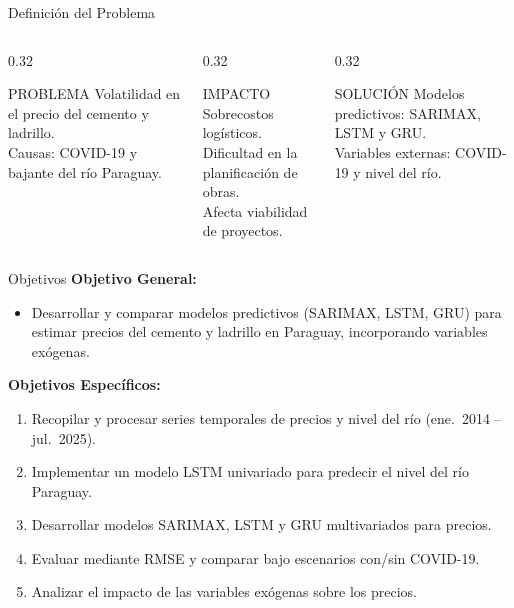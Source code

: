 \documentclass[12pt, aspectratio=169]{beamer}
\begin{document}
\begin{frame}{Definici\'on del Problema}
\begin{columns}[T]
  \begin{column}{0.32\textwidth}
    \begin{block}{\centering PROBLEMA}
    \centering\small
    Volatilidad en el precio del cemento y ladrillo.\\[0.2cm]
    Causas: COVID-19 y bajante del r\'io Paraguay.
    \end{block}
  \end{column}
  \begin{column}{0.32\textwidth}
    \begin{alertblock}{\centering IMPACTO}
    \centering\small
    Sobrecostos log\'isticos.\\[0.2cm]
    Dificultad en la planificaci\'on de obras.\\[0.2cm]
    Afecta viabilidad de proyectos.
    \end{alertblock}
  \end{column}
  \begin{column}{0.32\textwidth}
    \begin{exampleblock}{\centering SOLUCI\'ON}
    \centering\small
    Modelos predictivos: SARIMAX, LSTM y GRU.\\[0.2cm]
    Variables externas: COVID-19 y nivel del r\'io.
    \end{exampleblock}
  \end{column}
\end{columns}
\end{frame}

\begin{frame}{Objetivos}
\textbf{Objetivo General:}
\begin{itemize}
  \item Desarrollar y comparar modelos predictivos (SARIMAX, LSTM, GRU) para estimar precios del cemento y ladrillo en Paraguay, incorporando variables ex\'ogenas.
\end{itemize}

\vspace{0.3cm}
\textbf{Objetivos Espec\'ificos:}
\begin{enumerate}
  \item Recopilar y procesar series temporales de precios y nivel del r\'io (ene.\ 2014 -- jul.\ 2025).
  \item Implementar un modelo LSTM univariado para predecir el nivel del r\'io Paraguay.
  \item Desarrollar modelos SARIMAX, LSTM y GRU multivariados para precios.
  \item Evaluar mediante RMSE y comparar bajo escenarios con/sin COVID-19.
  \item Analizar el impacto de las variables ex\'ogenas sobre los precios.
\end{enumerate}
\end{frame}
\end{document}
